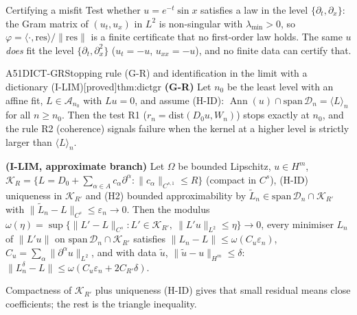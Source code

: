 \documentclass[11pt,a4paper,oneside]{report}
\newcommand{\badge}[2]{\textcolor{#1}{\textsf{\footnotesize[#2]}}}
\newcommand{\proved}{\badge{cC}{proved}}
\newcommand{\Ann}{\operatorname{Ann}}
\newenvironment{dimcard}[5]{\par\Needspace{12\baselineskip}\begin{dimcardbox}{#1}{#2}{#3}{#4}{#5}}{\end{dimcardbox}}
\begin{document}
\begin{example}{Certifying a misfit}
Test whether $u=e^{-t}\sin x$ satisfies a law in the level $\{\partial_t,\partial_x\}$: the Gram matrix of $(u_t,u_x)$ in $L^2$ is non-singular with $\lambda_{\min}>0$, so $\varphi=\langle\cdot,\mathrm{res}\rangle/\|\mathrm{res}\|$ is a finite certificate that no first-order law holds. The same $u$ \emph{does} fit the level $\{\partial_t,\partial_x^2\}$ ($u_t=-u$, $u_{xx}=-u$), and no finite data can certify that.
\end{example}

\begin{dimcard}{A51}{DICT-GR}{Stopping rule (G-R) and identification in the limit with a dictionary (I-LIM)}{\proved}{thm:dictgr}
\textbf{(G-R)} Let $n_0$ be the least level with an affine fit, $L\in\mathcal A_{n_0}$ with $Lu=0$, and assume (H-ID): $\Ann(u)\cap\mathrm{span}\,\mathcal D_n=\langle L\rangle_n$ for all $n\ge n_0$. Then the test R1 ($r_n=\mathrm{dist}(D_0u,W_n)$) stops exactly at $n_0$, and the rule R2 (coherence) signals failure when the kernel at a higher level is strictly larger than $\langle L\rangle_n$.

\textbf{(I-LIM, approximate branch)} Let $\Omega$ be bounded Lipschitz, $u\in H^m$, $\mathcal K_R=\{L=D_0+\sum_{\alpha\in A}c_\alpha\partial^\alpha:\|c_\alpha\|_{C^{s,1}}\le R\}$ (compact in $C^s$), (H-ID) uniqueness in $\mathcal K_{R'}$ and (H2) bounded approximability by $\tilde L_n\in\mathrm{span}\,\mathcal D_n\cap\mathcal K_{R'}$ with $\|\tilde L_n-L\|_{C^s}\le\varepsilon_n\to0$. Then the modulus $\omega(\eta)=\sup\{\|L'-L\|_{C^s}:L'\in\mathcal K_{R'},\ \|L'u\|_{L^2}\le\eta\}\to0$, every minimiser $L_n$ of $\|L'u\|$ on $\mathrm{span}\,\mathcal D_n\cap\mathcal K_{R'}$ satisfies $\|L_n-L\|\le\omega(C_u\varepsilon_n)$, $C_u=\sum_\alpha\|\partial^\alpha u\|_{L^2}$, and with data $\tilde u$, $\|\tilde u-u\|_{H^m}\le\delta$: $\|L_n^\delta-L\|\le\omega(C_u\varepsilon_n+2C_{R'}\delta)$.
\end{dimcard}

\begin{proofidea}
Compactness of $\mathcal K_{R'}$ plus uniqueness (H-ID) gives that small residual means close coefficients; the rest is the triangle inequality.
\end{proofidea}
\end{document}
